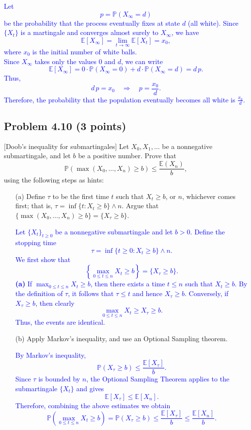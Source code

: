 \documentclass{article}
\begin{document}
\begin{enumerate}
    \textcolor{blue}{Let
\[
p = \mathbb{P}(X_\infty = d)
\]
be the probability that the process eventually fixes at state $d$ (all white). Since $\{X_t\}$ is a martingale and converges almost surely to $X_\infty$, we have
\[
\mathbb{E}[X_\infty] = \lim_{t\to\infty}\mathbb{E}[X_t] = x_0,
\]
where $x_0$ is the initial number of white balls. \\
Since $X_\infty$ takes only the values $0$ and $d$, we can write
\[
\mathbb{E}[X_\infty] = 0\cdot \mathbb{P}(X_\infty = 0) + d\cdot \mathbb{P}(X_\infty = d) = d\,p.
\]
Thus,
\[
d\,p = x_0 \quad \Longrightarrow \quad p = \frac{x_0}{d}.
\]
Therefore, the probability that the population eventually becomes all white is $\frac{x_0}{d}$.
}

\end{enumerate}

\subsection*{Problem 4.10 (3 points)}
[Doob’s inequality for submartingales] Let $X_0, X_1, \ldots$ be a nonnegative submartingale, and let $b$ be a positive number. Prove that
\[
\mathbb{P}(\max(X_0, \ldots, X_n) \geq b) \leq \frac{\mathbb{E}(X_n)}{b},
\]
using the following steps as hints:

\begin{enumerate}
    \item[(a)] Define $\tau$ to be the first time $t$ such that $X_t \geq b$, or $n$, whichever comes first; that is, $\tau = \inf\{t : X_t \geq b\} \wedge n$. Argue that $\{\max(X_0, \ldots, X_n) \geq b\} = \{X_\tau \geq b\}$.

        \textcolor{blue}{Let $\{X_t\}_{t\ge0}$ be a nonnegative submartingale and let $b>0$. Define the stopping time
\[
\tau = \inf\{t \ge 0 : X_t \ge b\} \wedge n.
\]
We first show that 
\[
\left\{\max_{0\le t \le n} X_t \ge b\right\} = \{X_\tau \ge b\}.
\]
\textbf{(a)} If $\max_{0\le t\le n} X_t \ge b$, then there exists a time $t \le n$ such that $X_t \ge b$. By the definition of $\tau$, it follows that $\tau \le t$ and hence $X_\tau \ge b$. Conversely, if $X_\tau \ge b$, then clearly
\[
\max_{0\le t\le n} X_t \ge X_\tau \ge b.
\]
Thus, the events are identical. }

    \item[(b)] Apply Markov’s inequality, and use an Optional Sampling theorem.

        \textcolor{blue}{By Markov's inequality,
\[
\mathbb{P}(X_\tau \ge b) \le \frac{\mathbb{E}[X_\tau]}{b}.
\]
Since $\tau$ is bounded by $n$, the Optional Sampling Theorem applies to the submartingale $\{X_t\}$ and gives
\[
\mathbb{E}[X_\tau] \le \mathbb{E}[X_n].
\]
Therefore, combining the above estimates we obtain
\[
\mathbb{P}\left(\max_{0\le t\le n} X_t \ge b\right) = \mathbb{P}(X_\tau \ge b) \le \frac{\mathbb{E}[X_\tau]}{b} \le \frac{\mathbb{E}[X_n]}{b}.
\]}
\end{enumerate}
\end{document}
